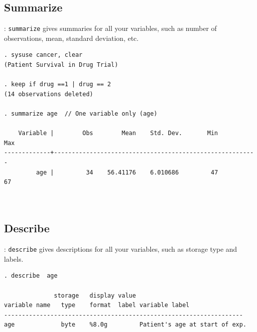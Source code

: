 \subsection{Summarize}
\begin{frame}[fragile]{\secname : \subsecname}
\verb|summarize| gives summaries for all your variables, such as number of observations, mean, standard deviation, etc. \\[4mm]
\scriptsize
\begin{verbatim}
. sysuse cancer, clear
(Patient Survival in Drug Trial)

. keep if drug ==1 | drug == 2
(14 observations deleted)

. summarize age  // One variable only (age)

    Variable |        Obs        Mean    Std. Dev.       Min        Max
-------------+---------------------------------------------------------
         age |         34    56.41176    6.010686         47         67

	
\end{verbatim}

\end{frame}


\subsection{Describe}
\begin{frame}[fragile]{\secname : \subsecname}
\verb|describe| gives descriptions for all your variables, such as storage type and labels. \\[4mm]
\scriptsize
\begin{verbatim}
. describe  age 

              storage   display value
variable name   type    format  label variable label
-------------------------------------------------------------------
age             byte    %8.0g         Patient's age at start of exp.


\end{verbatim}

\end{frame}

